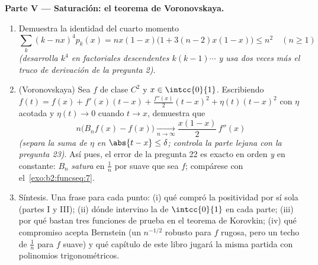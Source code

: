 \begin{problem}
\medskip
\noindent\textbf{Parte V --- Saturación: el teorema de
Voronovskaya.}
\begin{enumerate}[resume]
  \item Demuestra la identidad del cuarto momento
        \[
        \sum_k (k - nx)^4 p_k(x)
        = nx(1-x)\bigl(1 + 3(n-2)x(1-x)\bigr) \leq n^2
        \quad (n \geq 1)
        \]
        \emph{(desarrolla $k^4$ en factoriales descendentes
        $k(k-1)\cdots$ y usa dos veces más el truco de derivación de
        la pregunta 2)}.
  \item (Voronovskaya) Sea $f$ de clase $C^2$ y $x \in
        \intcc{0}{1}$. Escribiendo $f(t) = f(x) + f'(x)(t-x) +
        \frac{f''(x)}2(t-x)^2 + \eta(t)(t-x)^2$ con $\eta$ acotada y
        $\eta(t) \to 0$ cuando $t \to x$, demuestra que
        \[
        n\bigl(B_nf(x) - f(x)\bigr)
        \xrightarrow[n\to\infty]{}
        \frac{x(1-x)}{2}\,f''(x)
        \]
        \emph{(separa la suma de $\eta$ en $\abs{t - x} \leq
        \delta$; controla la parte lejana con la pregunta 23)}. Así
        pues, el error de la pregunta 22 es exacto en orden \emph{y}
        en constante: $B_n$ \emph{satura} en $\frac1n$ por suave que
        sea $f$; compárese con el~\cref{exo:b2:funcseq:7}.
  \item Síntesis. Una frase para cada punto: (i) qué compró la
        positividad por sí sola (partes I y III); (ii) dónde
        intervino la  de $\intcc{0}{1}$ en cada parte;
        (iii) por qué bastan tres funciones de prueba en el teorema
        de Korovkin; (iv) qué compromiso acepta Bernstein (un
        $n^{-1/2}$ robusto para $f$ rugosa, pero un techo de
        $\frac1n$ para $f$ suave) y qué capítulo de este libro
        jugará la misma partida con polinomios trigonométricos.
\end{enumerate}
\end{problem}

